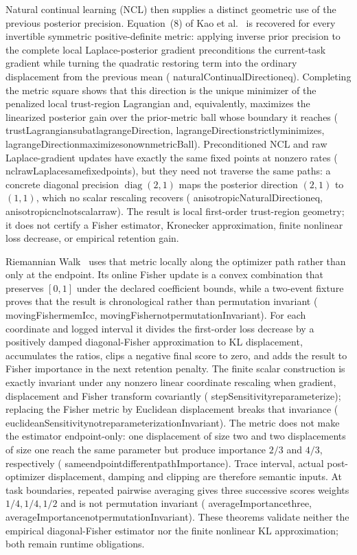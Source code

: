 \documentclass[11pt]{article}
\newcommand{\leanname}[1]{{\scriptsize\ttfamily
  \def\_{\textunderscore\allowbreak}#1}}
\begin{document}
Natural continual learning (NCL) then supplies a distinct geometric use of
the previous posterior precision.  Equation~(8) of Kao et
al.~\cite{kao2021ncl} is recovered for every invertible symmetric
positive-definite metric: applying inverse prior precision to the complete
local Laplace-posterior gradient preconditions the current-task gradient while
turning the quadratic restoring term into the ordinary displacement from the
previous mean
(\leanname{naturalContinualDirection\_eq}).  Completing the metric square
shows that this direction is the unique minimizer of the penalized local
trust-region Lagrangian and, equivalently, maximizes the linearized posterior
gain over the prior-metric ball whose boundary it reaches
(\leanname{trustLagrangian\_sub\_at\_lagrangeDirection},
\leanname{lagrangeDirection\_strictly\_minimizes},
\leanname{lagrangeDirection\_maximizes\_on\_own\_metricBall}).
Preconditioned NCL and raw Laplace-gradient updates have exactly the same
fixed points at nonzero rates
(\leanname{ncl\_rawLaplace\_same\_fixed\_points}), but they need not traverse
the same paths: a concrete diagonal precision $\operatorname{diag}(2,1)$ maps
the posterior direction $(2,1)$ to $(1,1)$, which no scalar rescaling
recovers
(\leanname{anisotropicNaturalDirection\_eq},
\leanname{anisotropic\_ncl\_not\_scalar\_raw}).  The result is local
first-order trust-region geometry; it does not certify a Fisher estimator,
Kronecker approximation, finite nonlinear loss decrease, or empirical
retention gain.

Riemannian Walk~\cite{chaudhry2018rwalk} uses that metric locally along the
optimizer path rather than only at the endpoint.  Its online Fisher update is
a convex combination that preserves $[0,1]$ under the declared coefficient
bounds, while a two-event fixture proves that the result is chronological
rather than permutation invariant
(\leanname{movingFisher\_mem\_Icc},
\leanname{movingFisher\_not\_permutationInvariant}).  For each coordinate and
logged interval it divides the first-order loss decrease by a positively
damped diagonal-Fisher approximation to KL displacement, accumulates the
ratios, clips a negative final score to zero, and adds the result to Fisher
importance in the next retention penalty.  The finite scalar construction is
exactly invariant under any nonzero linear coordinate rescaling when
gradient, displacement and Fisher transform covariantly
(\leanname{stepSensitivity\_reparameterize}); replacing the Fisher metric by
Euclidean displacement breaks that invariance
(\leanname{euclideanSensitivity\_not\_reparameterizationInvariant}).
The metric does not make the estimator endpoint-only: one displacement of
size two and two displacements of size one reach the same parameter but
produce importance $2/3$ and $4/3$, respectively
(\leanname{same\_endpoint\_different\_pathImportance}).  Trace interval,
actual post-optimizer displacement, damping and clipping are therefore
semantic inputs.  At task boundaries, repeated pairwise averaging gives
three successive scores weights $1/4,1/4,1/2$ and is not permutation
invariant
(\leanname{averageImportance\_three},
\leanname{averageImportance\_not\_permutationInvariant}).
These theorems validate neither the empirical diagonal-Fisher estimator nor
the finite nonlinear KL approximation; both remain runtime obligations.
\end{document}
